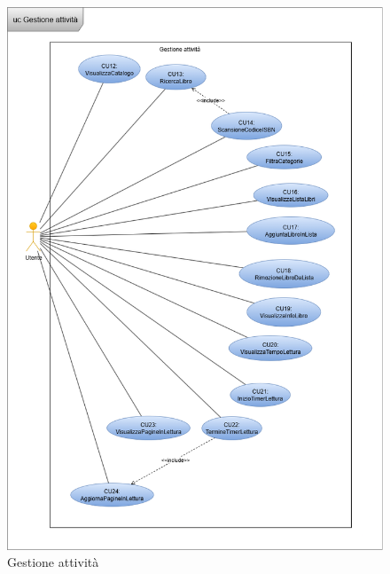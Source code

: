 \documentclass{article}
\begin{document}
\begin{figure}[H]
  \centering
  \includegraphics[width=0.9\linewidth]{cu_attivita.png}
  \caption{Gestione attività}
  \label{fig:sitemap}
\end{figure}
\end{document}
